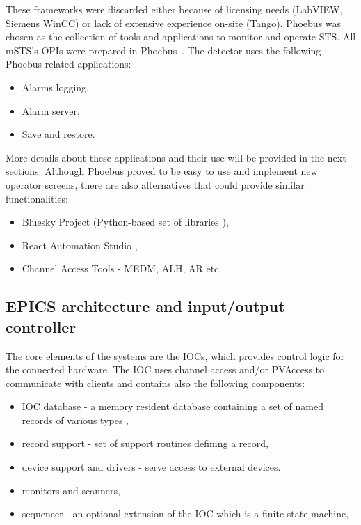  These frameworks were discarded either because of licensing needs (LabVIEW, Siemens WinCC) or lack of extensive experience on-site (Tango). Phoebus \cite{Phoebus} was chosen as the collection of tools and applications to monitor and operate \gls{STS}. All \gls{mSTS}'s \glspl{OPI} were prepared in Phoebus~\cite{Phoebus}. The detector uses the following Phoebus-related applications:
\begin{itemize}
    \item Alarms logging,
    \item Alarm server,
    \item Save and restore.
\end{itemize}
More details about these applications and their use will be provided in the next sections. Although Phoebus proved to be easy to use and implement new operator screens, there are also alternatives that could provide similar functionalities:
\begin{itemize}
    \item Bluesky Project (Python-based set of libraries \cite{Bluesky}),
    \item React Automation Studio \cite{React},
    \item Channel Access Tools - MEDM, \gls{ALH}, \gls{AR} etc. 
\end{itemize}

\subsection{EPICS architecture and input/output controller}
The core elements of the systems are the \glspl{IOC}, which provides control logic for the connected hardware. The \gls{IOC} uses channel access and/or PVAccess to communicate with clients and contains also the following components\cite{IOC}:
\begin{itemize}
    \item \gls{IOC} database -  a memory resident database containing a set of named records of various types \cite{IOC2},
    \item record support - set of support routines defining a record,
    \item device support and drivers - serve access to external devices.
    \item monitors and scanners,
    \item sequencer - an optional extension of the \gls{IOC} which is a finite state machine,
\end{itemize}

